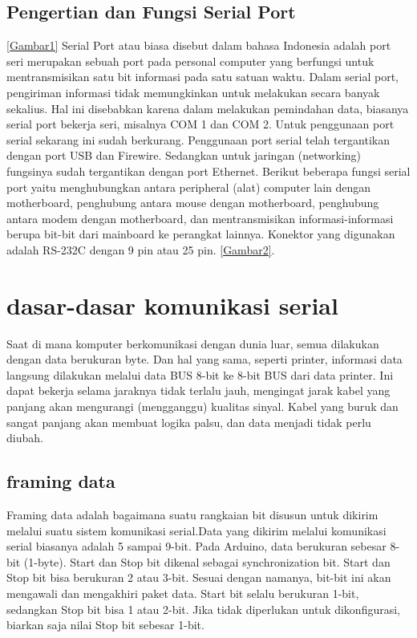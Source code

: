 {{\subsection {Pengertian dan Fungsi Serial Port}\ref{Gambar1}
Serial Port atau biasa disebut dalam bahasa Indonesia adalah port seri merupakan sebuah port pada personal computer yang berfungsi untuk mentransmisikan satu bit informasi pada satu satuan waktu. Dalam serial port, pengiriman informasi tidak memungkinkan untuk melakukan secara banyak sekalius. Hal ini disebabkan karena dalam melakukan pemindahan data, biasanya serial port bekerja seri, misalnya COM 1 dan COM 2. Untuk penggunaan port serial sekarang ini sudah berkurang. Penggunaan port serial telah tergantikan dengan port USB dan Firewire. Sedangkan untuk jaringan (networking) fungsinya sudah tergantikan dengan port Ethernet. Berikut beberapa fungsi serial port yaitu menghubungkan antara peripheral (alat) computer lain dengan motherboard, penghubung antara mouse dengan motherboard, penghubung antara modem dengan motherboard, dan mentransmisikan informasi-informasi berupa bit-bit dari mainboard ke perangkat lainnya. Konektor yang digunakan adalah RS-232C dengan 9 pin atau 25 pin. \ref{Gambar2}.

\section {dasar-dasar komunikasi serial}
Saat di mana komputer berkomunikasi dengan dunia luar, semua dilakukan dengan data berukuran byte. Dan hal yang sama, seperti printer, informasi data langsung dilakukan melalui data BUS 8-bit ke 8-bit BUS dari data printer. Ini dapat bekerja selama jaraknya tidak terlalu jauh, mengingat jarak kabel yang panjang akan mengurangi (mengganggu) kualitas sinyal. Kabel yang buruk dan sangat panjang akan membuat logika palsu, dan data menjadi tidak perlu diubah.
\subsection {framing data}
Framing data adalah bagaimana suatu rangkaian bit disusun untuk dikirim melalui suatu sistem komunikasi serial.Data yang dikirim melalui komunikasi serial biasanya adalah 5 sampai 9-bit. Pada Arduino, data berukuran sebesar 8-bit (1-byte).
Start dan Stop bit dikenal sebagai synchronization bit. Start dan Stop bit bisa berukuran 2 atau 3-bit. Sesuai dengan namanya, bit-bit ini akan mengawali dan mengakhiri paket data. Start bit selalu berukuran 1-bit, sedangkan Stop bit bisa 1 atau 2-bit. Jika tidak diperlukan untuk dikonfigurasi, biarkan saja nilai Stop bit sebesar 1-bit.

}}
